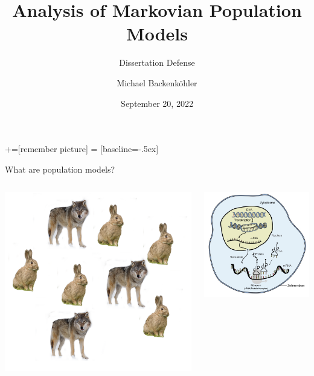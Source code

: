 \documentclass[9pt]{beamer}
\title{Analysis of Markovian Population Models}
\subtitle{Dissertation Defense}
\author{Michael Backenk\"{o}hler}
\institute{Saarland Informatics Campus}
\date{September 20, 2022}
\begin{document}
+=[remember picture]
 = [baseline=-.5ex]

\begin{frame}
\titlepage
\end{frame}

\begin{frame}{What are population models?}
    \begin{columns}
        \begin{column}{.3\paperwidth}
            \includegraphics[width=\textwidth]{../gfx/population_wolf_rabbit.png}
        \end{column}
        \begin{column}{.3\paperwidth}
            \includegraphics[width=\textwidth]{../gfx/expression.jpg}

\end{column}
\end{columns}
\end{frame}
\end{document}
